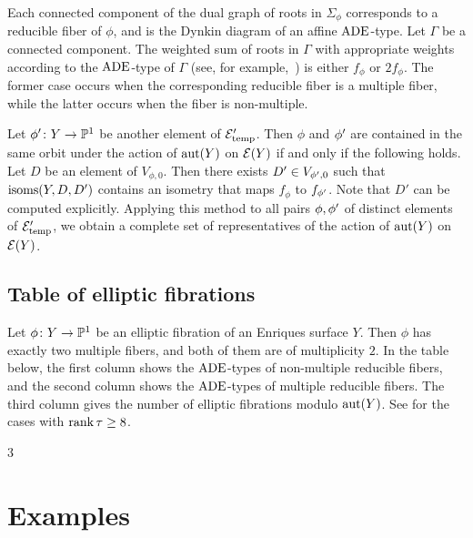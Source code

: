 \documentclass{amsart}
\numberwithin{procedure}{section}
\begin{document}
Each connected component of the dual graph of roots
in $\Sigma_{\phi}$
corresponds to a reducible fiber of $\phi$,
and is the Dynkin diagram of an affine
$\ADE$-type.
Let $\Gamma$ be a connected component.
The weighted sum of roots in $\Gamma$
with appropriate weights according to the $\ADE$-type of $\Gamma$
(see, for example,~\cite[Theorem 5.12]{SMSbook})
is either $f_{\phi}$ or $2f_{\phi}$.
The former case occurs when the corresponding reducible fiber is a multiple fiber,
while the latter occurs when the  fiber is non-multiple.
\par
Let $\phi\sprime\colon Y\to\P^1$ be another element of $\Ells_{\temp}\sprime$.
Then $\phi$ and $\phi\sprime$ are contained in the same orbit
under the action of $\aut(Y)$ on $\Ells(Y)$
if and only if the following holds.
Let $D$ be an element of $V_{\phi, 0}$.
Then there exists $D\sprime \in V_{\phi\sprime, 0}$
such that $\isoms(Y, D, D\sprime)$ contains an isometry
that maps $f_{\phi}$ to $f_{\phi\sprime}$. 
Note that $D'$ can be computed explicitly.
Applying this method to all pairs $\phi, \phi\sprime$
of distinct elements of $\Ells_{\temp}\sprime$,
we obtain a complete set of representatives of
the action of $\aut(Y)$ on $\Ells(Y)$.
%
%
%
\subsection{Table of elliptic fibrations}\label{subsec:tableells}
%
Let $\phi\colon Y\to \P^1$ be
an elliptic fibration of an Enriques surface $Y$.
Then $\phi$ has exactly two multiple fibers,
and both of them are of multiplicity $2$.
In the table below,
the first column shows the $\ADE$-types of non-multiple reducible fibers,
and the second column shows the $\ADE$-types of multiple reducible fibers.
The third column gives the number of elliptic fibrations modulo $\aut(Y)$. 
See \cite{AutEnrVolCompdata} for the cases with $\rank \tau \geq 8$.
%
\par
{\tiny
\setlength{\columnsep}{10pt}
\setlength{\columnseprule}{.4pt}
\begin{multicols}{3}
\renewcommand{\arraystretch}{.85}
\par\noindent

\end{multicols}
}
%
\section{Examples}\label{sec:examples}
%
\end{document}
